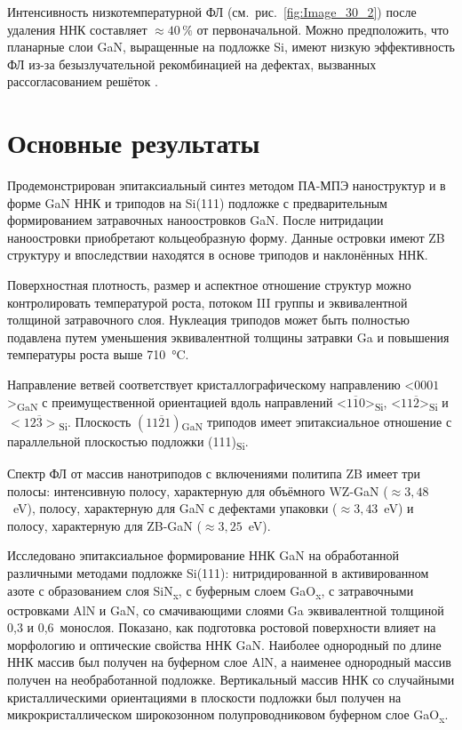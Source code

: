 Интенсивность низкотемпературной ФЛ (см.~рис.~\cref{fig:Image_30_2}) после
удаления ННК составляет \(\approx 40\,\%\) от первоначальной. Можно
предположить, что планарные слои GaN, выращенные на подложке Si, имеют низкую
эффективность ФЛ из-за безызлучательной рекомбинацией на дефектах, вызванных
рассогласованием решёток \cite{Calleja1999, Reshchikov2005}.

\section{Основные результаты}\label{sec:ch3/sec3}

Продемонстрирован эпитаксиальный синтез методом ПА-МПЭ наноструктур и в форме
GaN ННК и триподов на Si(111) подложке с предварительным формированием
затравочных наноостровков GaN. После нитридации наноостровки приобретают
кольцеобразную форму. Данные островки имеют ZB структуру и впоследствии
находятся в основе триподов и наклонённых ННК.

Поверхностная плотность, размер и аспектное отношение структур можно
контролировать температурой роста, потоком III группы и эквивалентной толщиной
затравочного слоя. Нуклеация триподов может быть полностью подавлена путем
уменьшения эквивалентной толщины затравки Ga и повышения температуры роста выше
710~\si{\degreeCelsius}.

Направление ветвей соответствует кристаллографическому направлению
<\(0001\)>\textsubscript{GaN} с преимущественной ориентацией вдоль направлений
<\(1\overline{1}0\)>\textsubscript{Si}, <\(11\overline{2}\)>\textsubscript{Si}
и \(<12\overline{3}>\)\textsubscript{Si}. Плоскость
\((11\overline{2}1)\)\textsubscript{GaN} триподов имеет эпитаксиальное
отношение с параллельной плоскостью подложки (111)\textsubscript{Si}.

Спектр ФЛ от массив нанотриподов с включениями политипа ZB имеет три полосы:
интенсивную полосу, характерную для объёмного WZ-GaN (\(\approx
3,48\)~\si{\electronvolt}), полосу, характерную для GaN с дефектами упаковки
(\(\approx 3,43\)~\si{\electronvolt}) и полосу, характерную для ZB-GaN
(\(\approx 3,25\)~\si{\electronvolt}).

Исследовано эпитаксиальное формирование ННК GaN на обработанной различными
методами подложке Si(111): нитридированной в активированном азоте с
образованием слоя SiN\textsubscript{x}, с буферным слоем GaO\textsubscript{x},
с затравочными островками AlN и GaN, со смачивающими слоями Ga эквивалентной
толщиной 0,3 и 0,6~монослоя. Показано, как подготовка ростовой поверхности
влияет на морфологию и оптические свойства ННК GaN. Наиболее однородный по
длине ННК массив был получен на буферном слое AlN, а наименее однородный массив
получен на необработанной подложке. Вертикальный массив ННК со случайными
кристаллическими ориентациями в плоскости подложки был получен на
микрокристаллическом широкозонном полупроводниковом буферном слое
GaO\textsubscript{x}.


